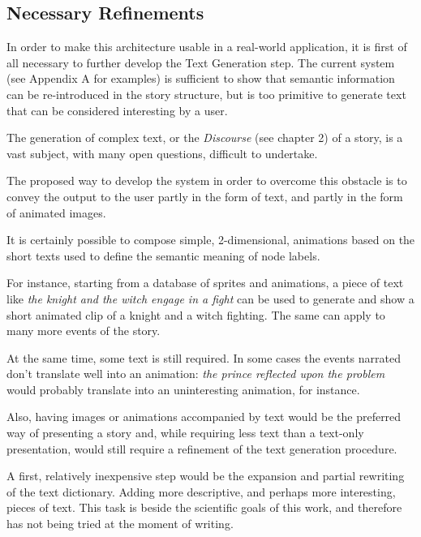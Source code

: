 \documentclass[12pt,a4paper,oneside]{report}
\begin{document}
\bigskip

\subsection{Necessary Refinements}

In order to make this architecture usable in a real-world application, it is first of all necessary to further develop the Text Generation step. The current system (see Appendix A for examples) is sufficient to show that semantic information can be re-introduced in the story structure, but is too primitive to generate text that can be considered interesting by a user.

The generation of complex text, or the \textit{Discourse} (see chapter 2) of a story, is a vast subject, with many open questions, difficult to undertake. 

The proposed way to develop the system in order to overcome this obstacle is to convey the output to the user partly in the form of text, and partly in the form of animated images.

It is certainly possible to compose simple, 2-dimensional, animations based on the short texts used to define the semantic meaning of node labels. 

\bigskip

For instance, starting from a database of sprites and animations, a piece of text like \textit{the knight and the witch engage in a fight} can be used to generate and show a short animated clip of a knight and a witch fighting. The same can apply to many more events of the story.

At the same time, some text is still required. In some cases the events narrated don't translate well into an animation: \textit{the prince reflected upon the problem} would probably translate into an uninteresting animation, for instance. 

Also, having images or animations accompanied by text would be the preferred way of presenting a story and, while requiring less text than a text-only presentation, would still require a refinement of the text generation procedure.

\bigskip

A first, relatively inexpensive step would be the expansion and partial rewriting of the text dictionary. Adding more descriptive, and perhaps more interesting, pieces of text. This task is beside the scientific goals of this work, and therefore has not being tried at the moment of writing.
\end{document}
